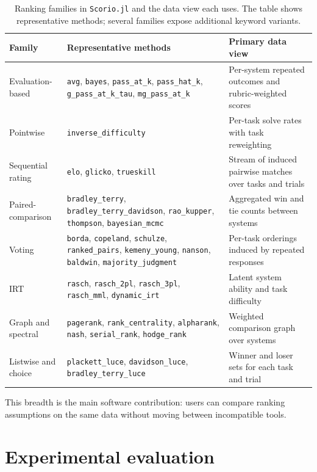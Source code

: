 \documentclass{juliacon}
\newcommand{\scorio}{\texttt{Scorio.jl}}
\begin{document}
\begin{table}[t]
\centering
\caption{Ranking families in \scorio{} and the data view each uses. The table shows representative methods; several families expose additional keyword variants.}
\label{tab:families}
\small
\begin{tabular}{L{0.18\textwidth}L{0.45\textwidth}L{0.27\textwidth}}
\toprule
Family & Representative methods & Primary data view \\
\midrule
Evaluation-based & \texttt{avg}, \texttt{bayes}, \texttt{pass\_at\_k}, \texttt{pass\_hat\_k}, \texttt{g\_pass\_at\_k\_tau}, \texttt{mg\_pass\_at\_k} & Per-system repeated outcomes and rubric-weighted scores \\
Pointwise & \texttt{inverse\_difficulty} & Per-task solve rates with task reweighting \\
Sequential rating & \texttt{elo}, \texttt{glicko}, \texttt{trueskill} & Stream of induced pairwise matches over tasks and trials \\
Paired-comparison & \texttt{bradley\_terry}, \texttt{bradley\_terry\_davidson}, \texttt{rao\_kupper}, \texttt{thompson}, \texttt{bayesian\_mcmc} & Aggregated win and tie counts between systems \\
Voting & \texttt{borda}, \texttt{copeland}, \texttt{schulze}, \texttt{ranked\_pairs}, \texttt{kemeny\_young}, \texttt{nanson}, \texttt{baldwin}, \texttt{majority\_judgment} & Per-task orderings induced by repeated responses \\
IRT & \texttt{rasch}, \texttt{rasch\_2pl}, \texttt{rasch\_3pl}, \texttt{rasch\_mml}, \texttt{dynamic\_irt} & Latent system ability and task difficulty \\
Graph and spectral & \texttt{pagerank}, \texttt{rank\_centrality}, \texttt{alpharank}, \texttt{nash}, \texttt{serial\_rank}, \texttt{hodge\_rank} & Weighted comparison graph over systems \\
Listwise and choice & \texttt{plackett\_luce}, \texttt{davidson\_luce}, \texttt{bradley\_terry\_luce} & Winner and loser sets for each task and trial \\
\bottomrule
\end{tabular}
\end{table}

This breadth is the main software contribution: users can compare ranking assumptions on the same data without moving between incompatible tools.

\section{Experimental evaluation}
\end{document}
